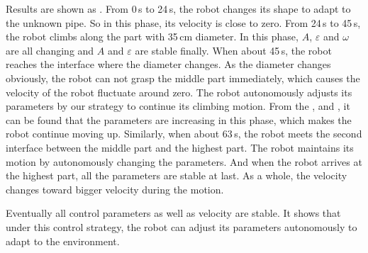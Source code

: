 Results are shown as . From 0\,s to 24\,s, the robot changes its shape to  adapt to the unknown pipe. So in this phase, its velocity is close to zero. From 24\,s to 45\,s, the robot climbs along the part with 35\,cm diameter. In this phase, $A$, $\varepsilon$ and $\omega$ are all changing and $A$ and $\varepsilon$ are stable finally. When about 45\,s, the robot reaches the interface where the diameter changes. As the diameter changes obviously, the robot can not grasp the middle part immediately, which causes the velocity of the robot fluctuate around zero. The robot autonomously adjusts its parameters by our strategy to continue its climbing motion. From the ,  and , it can be found that the parameters are increasing in this phase, which makes the robot continue moving up. Similarly, when about 63\,s, the robot meets the second interface between the middle part and the highest part. The robot maintains its motion by autonomously changing the parameters. And when the robot arrives at the highest part, all the parameters are stable at last. As a whole, the velocity changes toward bigger velocity during the motion.

Eventually all control parameters as well as velocity are stable. It shows that under this control strategy, the robot can adjust its parameters autonomously to adapt to the environment.





